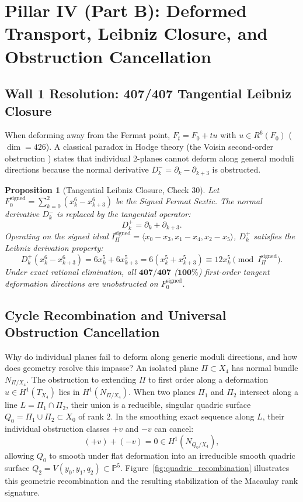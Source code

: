 \documentclass[11pt,a4paper]{article}
\newtheorem{proposition}[theorem]{Proposition}
\theoremstyle{definition}
\theoremstyle{remark}
\begin{document}
\section{Pillar IV (Part B): Deformed Transport, Leibniz Closure, and Obstruction Cancellation}
\label{sec:pillar_4b}

\subsection{Wall 1 Resolution: 407/407 Tangential Leibniz Closure}
When deforming away from the Fermat point, $F_t = F_0 + t u$ with $u \in R^6(F_0)$ ($\dim = 426$). A classical paradox in Hodge theory (the Voisin second-order obstruction \cite{Voisin2002}) states that individual 2-planes cannot deform along general moduli directions because the normal derivative $D_k^- = \partial_k - \partial_{k+3}$ is obstructed.

\begin{proposition}[Tangential Leibniz Closure, Check 30]
Let $F_0^{\mathrm{signed}} = \sum_{k=0}^2 (x_k^6 - x_{k+3}^6)$ be the Signed Fermat Sextic. The normal derivative $D_k^-$ is replaced by the tangential operator:
\begin{equation}
D_k^+ = \partial_k + \partial_{k+3}.
\end{equation}
Operating on the signed ideal $I_\Pi^{\mathrm{signed}} = \langle x_0 - x_3, x_1 - x_4, x_2 - x_5 \rangle$, $D_k^+$ satisfies the Leibniz derivation property:
\begin{equation}
D_k^+(x_k^6 - x_{k+3}^6) = 6x_k^5 + 6x_{k+3}^5 = 6(x_k^5 + x_{k+3}^5) \equiv 12 x_k^5 \pmod{I_\Pi^{\mathrm{signed}}}.
\end{equation}
Under exact rational elimination, all $\mathbf{407 / 407}$ ($\mathbf{100\%}$) first-order tangent deformation directions are unobstructed on $F_0^{\mathrm{signed}}$.
\end{proposition}

\subsection{Cycle Recombination and Universal Obstruction Cancellation}
Why do individual planes fail to deform along generic moduli directions, and how does geometry resolve this impasse? An isolated plane $\Pi \subset X_4$ has normal bundle $N_{\Pi/X_4}$. The obstruction to extending $\Pi$ to first order along a deformation $u \in H^1(T_{X_4})$ lies in $H^1(N_{\Pi/X_4})$. When two planes $\Pi_1$ and $\Pi_2$ intersect along a line $L = \Pi_1 \cap \Pi_2$, their union is a reducible, singular quadric surface $Q_0 = \Pi_1 \cup \Pi_2 \subset X_0$ of rank $2$. In the smoothing exact sequence along $L$, their individual obstruction classes $+v$ and $-v$ can cancel:
\begin{equation}
(+v) + (-v) = 0 \in H^1(N_{Q_0/X_4}),
\end{equation}
allowing $Q_0$ to smooth under flat deformation into an irreducible smooth quadric surface $Q_2 = V(y_0, y_1, q_2) \subset \mathbb{P}^5$. Figure~\ref{fig:quadric_recombination} illustrates this geometric recombination and the resulting stabilization of the Macaulay rank signature.
\end{document}
